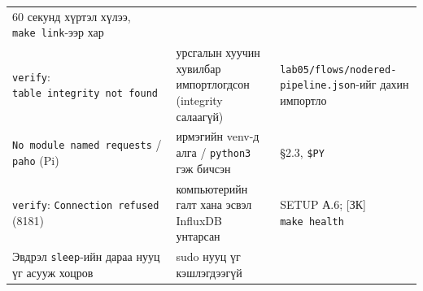 \begin{longtable}[]{@{}lll@{}}
\begin{minipage}[t]{0.30\columnwidth}
60 секунд хүртэл хүлээ, \texttt{make\ link}-ээр хар\strut
\end{minipage}\tabularnewline
\begin{minipage}[t]{0.30\columnwidth}\raggedright
\texttt{verify}: \texttt{table\ \textquotesingle{}integrity\textquotesingle{}\ not\ found}\strut
\end{minipage} & \begin{minipage}[t]{0.30\columnwidth}\raggedright
урсгалын хуучин хувилбар импортлогдсон (integrity салаагүй)\strut
\end{minipage} & \begin{minipage}[t]{0.30\columnwidth}\raggedright
\texttt{lab05/\allowbreak{}flows/\allowbreak{}nodered-pipeline.\allowbreak{}json}-ийг дахин импортло\strut
\end{minipage}\tabularnewline
\begin{minipage}[t]{0.30\columnwidth}\raggedright
\texttt{No\ module\ named\ \textquotesingle{}requests\textquotesingle{}} / \texttt{\textquotesingle{}paho\textquotesingle{}} (Pi)\strut
\end{minipage} & \begin{minipage}[t]{0.30\columnwidth}\raggedright
ирмэгийн venv-д алга / \texttt{python3} гэж бичсэн\strut
\end{minipage} & \begin{minipage}[t]{0.30\columnwidth}\raggedright
§2.3, \texttt{\$PY}\strut
\end{minipage}\tabularnewline
\begin{minipage}[t]{0.30\columnwidth}\raggedright
\texttt{verify}: \texttt{Connection\ refused} (8181)\strut
\end{minipage} & \begin{minipage}[t]{0.30\columnwidth}\raggedright
компьютерийн галт хана эсвэл InfluxDB унтарсан\strut
\end{minipage} & \begin{minipage}[t]{0.30\columnwidth}\raggedright
SETUP А.6; {[}ЗК{]} \texttt{make\ health}\strut
\end{minipage}\tabularnewline
\begin{minipage}[t]{0.30\columnwidth}\raggedright
Эвдрэл \texttt{sleep}-ийн дараа нууц үг асууж хоцров\strut
\end{minipage} & \begin{minipage}[t]{0.30\columnwidth}\raggedright
sudo нууц үг кэшлэгдээгүй\strut
\end{minipage} & \begin{minipage}[t]{0.30\columnwidth}\raggedright

\end{minipage}
\end{longtable}
